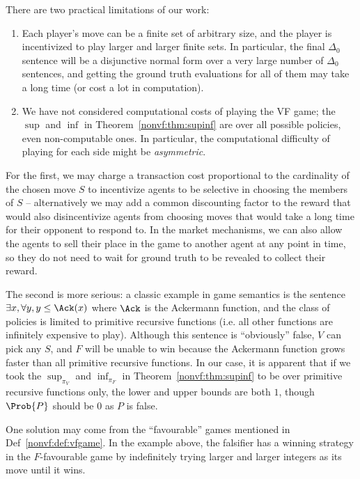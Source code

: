 There are two practical limitations of our work:
\begin{enumerate}
  \item Each player's move can be a finite set of arbitrary size, and the player is incentivized to play larger and larger finite sets. In particular, the final $\Delta_0$ sentence will be a disjunctive normal form over a very large number of $\Delta_0$ sentences, and getting the ground truth evaluations for all of them may take a long time (or cost a lot in computation).
  \item We have not considered computational costs of playing the VF game; the $\sup$ and $\inf$ in Theorem~\ref{nonvf:thm:supinf} are over all possible policies, even non-computable ones. In particular, the computational difficulty of playing for each side might be \emph{asymmetric}.
\end{enumerate}

For the first, we may charge a transaction cost proportional to the cardinality of the chosen move $S$ to incentivize agents to be selective in choosing the members of $S$ -- alternatively we may add a common discounting factor to the reward that would also disincentivize agents from choosing moves that would take a long time for their opponent to respond to. In the market mechanisms, we can also allow the agents to sell their place in the game to another agent at any point in time, so they do not need to wait for ground truth to be revealed to collect their reward.

The second is more serious: a classic example in game semantics \citep{solovievVerifierFalsifierGamesRestrictions2022} is the sentence $\exists x,\forall y,y\le\Ack(x)$ where $\Ack$ is the Ackermann function, and the class of policies is limited to primitive recursive functions (i.e. all other functions are infinitely expensive to play). Although this sentence is ``obviously'' false, $V$ can pick any $S$, and $F$ will be unable to win because the Ackermann function grows faster than all primitive recursive functions. In our case, it is apparent that if we took the $\sup_{\pi_V}$ and $\inf_{\pi_F}$ in Theorem~\ref{nonvf:thm:supinf} to be over primitive recursive functions only, the lower and upper bounds are both $1$, though $\Prob{P}$ should be 0 as $P$ is false.

One solution may come from the ``favourable'' games mentioned in Def~\ref{nonvf:def:vfgame}. In the example above, the falsifier has a winning strategy in the $F$-favourable game by indefinitely trying larger and larger integers as its move until it wins.

